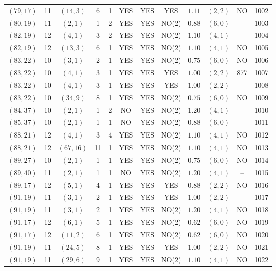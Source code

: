 \begin{longtable}{|c|c|c|c|c|c|c|c|c|c|c|c|}
$(79,17)$ & 11 & $(14,3)$ & 6 & 1 & YES & YES & YES & $1.11$ & $(2,2)$ & NO & 1002\\
$(80,19)$ & 11 & $(2,1)$ & 1 & 2 & YES & YES & NO(2) & $0.88$ & $(6,0)$ & -- & 1003\\
$(82,19)$ & 12 & $(4,1)$ & 3 & 2 & YES & YES & NO(2) & $1.10$ & $(4,1)$ & -- & 1004\\
$(82,19)$ & 12 & $(13,3)$ & 6 & 1 & YES & YES & NO(2) & $1.10$ & $(4,1)$ & NO & 1005\\
$(83,22)$ & 10 & $(3,1)$ & 2 & 1 & YES & YES & NO(2) & $0.75$ & $(6,0)$ & NO & 1006\\
$(83,22)$ & 10 & $(4,1)$ & 3 & 1 & YES & YES & YES & $1.00$ & $(2,2)$ & 877 & 1007\\
$(83,22)$ & 10 & $(4,1)$ & 3 & 1 & YES & YES & YES & $1.00$ & $(2,2)$ & -- & 1008\\
$(83,22)$ & 10 & $(34,9)$ & 8 & 1 & YES & YES & NO(2) & $0.75$ & $(6,0)$ & NO & 1009\\
$(84,37)$ & 10 & $(2,1)$ & 1 & 2 & NO & YES & NO(2) & $1.20$ & $(4,1)$ & -- & 1010\\
$(85,37)$ & 10 & $(2,1)$ & 1 & 1 & NO & YES & NO(2) & $0.88$ & $(6,0)$ & -- & 1011\\
$(88,21)$ & 12 & $(4,1)$ & 3 & 4 & YES & YES & NO(2) & $1.10$ & $(4,1)$ & NO & 1012\\
$(88,21)$ & 12 & $(67,16)$ & 11 & 1 & YES & YES & NO(2) & $1.10$ & $(4,1)$ & NO & 1013\\
$(89,27)$ & 10 & $(2,1)$ & 1 & 1 & YES & YES & NO(2) & $0.75$ & $(6,0)$ & NO & 1014\\
$(89,40)$ & 11 & $(2,1)$ & 1 & 1 & NO & YES & NO(2) & $1.20$ & $(4,1)$ & -- & 1015\\
$(89,17)$ & 12 & $(5,1)$ & 4 & 1 & YES & YES & YES & $0.88$ & $(2,2)$ & NO & 1016\\
$(91,19)$ & 11 & $(3,1)$ & 2 & 1 & YES & YES & YES & $1.00$ & $(2,2)$ & -- & 1017\\
$(91,19)$ & 11 & $(3,1)$ & 2 & 1 & YES & YES & NO(2) & $1.20$ & $(4,1)$ & NO & 1018\\
$(91,17)$ & 12 & $(6,1)$ & 5 & 1 & YES & YES & NO(2) & $0.62$ & $(6,0)$ & NO & 1019\\
$(91,17)$ & 12 & $(11,2)$ & 6 & 1 & YES & YES & NO(2) & $0.62$ & $(6,0)$ & NO & 1020\\
$(91,19)$ & 11 & $(24,5)$ & 8 & 1 & YES & YES & YES & $1.00$ & $(2,2)$ & NO & 1021\\
$(91,19)$ & 11 & $(29,6)$ & 9 & 1 & YES & YES & NO(2) & $1.10$ & $(4,1)$ & NO & 1022\\

\end{longtable}
